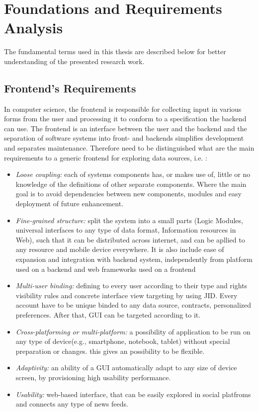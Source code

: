 \chapter{Foundations and Requirements Analysis}
The fundamental terms used in this thesis are described below for better understanding of the presented research work.

\section {Frontend's Requirements}
In computer science, the frontend is responsible for collecting input in various forms from the user and processing it to conform to a specification the backend can use. The frontend is an interface between the user and the backend\cite{wiki:xxx} and the separation of software systems into front- and backends simplifies development and separates maintenance. Therefore need to be distinguished what are the main requirements to a generic frontend for exploring data sources, i.e. :
\begin{itemize}

\item \emph{Loose coupling:} each of systems components has, or makes use of, little or no knowledge of the definitions of other separate components. Where the main goal is to avoid dependencies between new components, modules and easy deployment of future enhancement.

\item \emph{Fine-grained structure:} split the system into a small parts (Logic Modules, universal interfaces to any type of data format, Information resources in Web), such that it can be distributed across internet, and can be apllied to any resource and mobile device everywhere. It is also include ease of expansion and integration with backend system, independently from platform used on a backend and web frameworks used on a frontend

\item \emph{Multi-user binding:} defining to every user according to their type and rights visibility rules and concrete interface view targeting by using JID. Every account have to be unique binded to any data source, contracts, personalized preferences. After that, GUI can be targeted according to it.

\item \emph{Cross-platforming or multi-platform:} a possibility of application to be run on any type of device(e.g., smartphone, notebook, tablet) without special preparation or changes. this gives an possibility to be flexible.

\item \emph{Adaptivity:} an ability of a GUI automatically adapt to any size of device screen, by provisioning high 
      usability performance.

\item \emph{Usability:} web-based interface, that can be easily explored in social platfroms and connects any type of news feeds.
\end{itemize} 

